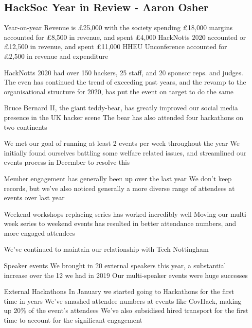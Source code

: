 \documentclass[11pt]{meetingmins}
\begin{document}
\subsection{HackSoc Year in Review - Aaron Osher}
\begin{hiddensubitems}
	\item
	Year-on-year Revenue is \pounds25,000 with the society spending \pounds18,000
		\subitem
		margins accounted for \pounds8,500 in revenue, and spent \pounds4,000
		\subitem
		HackNotts 2020 accounted or \pounds12,500 in revenue, and spent \pounds11,000
		\subitem
		HHEU Unconference accounted for \pounds2,500 in revenue and expenditure
	\item
	HackNotts 2020 had over 150 hackers, 25 staff, and 20 sponsor reps. and judges.
		\subitem
		The even has continued the trend of exceeding past years, and the revamp to the organisational structure for 2020, has put the event on target to do the same
	\item
	Bruce Bernard II, the giant teddy-bear, has greatly improved our social media presence in the UK hacker scene
		\subitem The bear has also attended four hackathons on two continents
	\item
	We met our goal of running at least 2 events per week throughout the year
		\subitem
		We initially found ourselves battling some welfare related issues, and streamlined our events process in December to resolve this
	\item
	Member engagement has generally been up over the last year
		\subitem
		We don't keep records, but we've also noticed generally a more diverse range of attendees at events over last year
	\item
	Weekend workshops replacing series has worked incredibly well
		\subitem
		Moving our multi-week series to weekend events has resulted in better attendance numbers, and more engaged attendees
	\item
	We've continued to maintain our relationship with Tech Nottingham
	\item
	Speaker events
		\subitem
		We brought in 20 external speakers this year, a substantial increase over the 12 we had in 2019
		\subitem
		Our multi-speaker events were huge successes
	\item
	External Hackathons
		\subitem
		In January we started going to Hackathons for the first time in years
		\subitem
		We've smashed attendee numbers at events like CovHack, making up 20\% of the event's attendees
		\subitem
		We've also subsidised hired transport for the first time to account for the significant engagement
\end{hiddensubitems}
\end{document}
